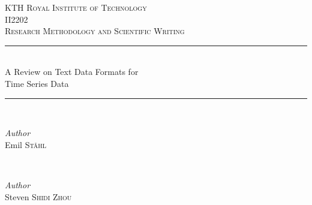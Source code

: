 
\begin{titlepage} %
	\newcommand{\HRule}{\rule{\linewidth}{0.5mm}} %
	
	\center %
	
	
	\textsc{\LARGE KTH Royal Institute of Technology }\\[1.5cm] %
	
	\textsc{\Large II2202}\\[0.5cm] %
	
	\textsc{\large Research Methodology and Scientific Writing}\\[0.5cm] %
	
	
	\HRule\\[0.4cm]
	
	{\huge A Review on Text Data Formats for\\ Time Series Data}\\[0.1cm] %
	
	\HRule\\[1.5cm]
	
	
		\begin{minipage}{0.4\textwidth}
		\begin{flushleft}
			\large
			\textit{Author}\\
			Emil \textsc{Ståhl}  %
		\end{flushleft}
	\end{minipage}
	~
	\begin{minipage}{0.4\textwidth}
		\begin{flushright}
			\large
			\textit{Author}\\
		    Steven \textsc{Shidi Zhou} 
		\end{flushright}
	\end{minipage}


\end{titlepage}
